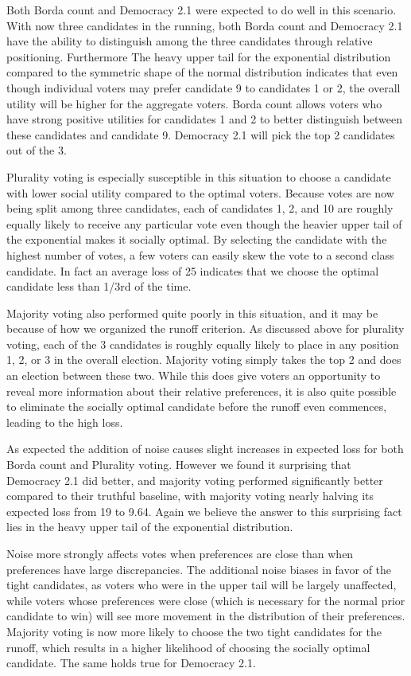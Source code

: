 \documentclass[11pt]{scrartcl}
\begin{document}
Both Borda count and Democracy 2.1 were expected to do well in this scenario. With now three candidates in the running, both Borda count and Democracy 2.1 have the ability to distinguish among the three candidates through relative positioning. Furthermore The heavy upper tail for the exponential distribution compared to the symmetric shape of the normal distribution indicates that even though individual voters may prefer candidate 9 to candidates 1 or 2, the overall utility will be higher for the aggregate voters. Borda count allows voters who have strong positive utilities for candidates 1 and 2 to better distinguish between these candidates and candidate 9. Democracy 2.1 will pick the top 2 candidates out of the 3.

Plurality voting is especially susceptible in this situation to choose a candidate with lower social utility compared to the optimal voters. Because votes are now being split among three candidates, each of candidates 1, 2, and 10 are roughly equally likely to receive any particular vote even though the heavier upper tail of the exponential makes it socially optimal. By selecting the candidate with the highest number of votes, a few voters can easily skew the vote to a second class candidate. In fact an average loss of 25 indicates that we choose the optimal candidate less than 1/3rd of the time.

Majority voting also performed quite poorly in this situation, and it may be because of how we organized the runoff criterion. As discussed above for plurality voting, each of the 3 candidates is roughly equally likely to place in any position 1, 2, or 3 in the overall election. Majority voting simply takes the top 2 and does an election between these two. While this does give voters an opportunity to reveal more information about their relative preferences, it is also quite possible to eliminate the socially optimal candidate before the runoff even commences, leading to the high loss.

As expected the addition of noise causes slight increases in expected loss for both Borda count and Plurality voting. However we found it surprising that Democracy 2.1 did better, and majority voting performed significantly better compared to their truthful baseline, with majority voting nearly halving its expected loss from 19 to 9.64. Again we believe the answer to this surprising fact lies in the heavy upper tail of the exponential distribution.

Noise more strongly affects votes when preferences are close than when preferences have large discrepancies. The additional noise biases in favor of the tight candidates, as voters who were in the upper tail will be largely unaffected, while voters whose preferences were close (which is necessary for the normal prior candidate to win) will see more movement in the distribution of their preferences. Majority voting is now more likely to choose the two tight candidates for the runoff, which results in a higher likelihood of choosing the socially optimal candidate. The same holds true for Democracy 2.1.
\end{document}
